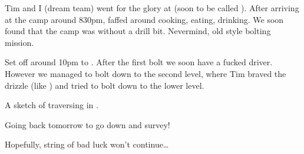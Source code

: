 Tim and I (dream team) went for the glory at  (soon to be
called ). After arriving at the camp around 830pm, faffed around cooking, eating, drinking. We soon found that the camp was without a drill bit. Nevermind, old style bolting mission.

Set off around 10pm to . After the first bolt we soon have a fucked driver. However we managed to bolt down to the second level, where Tim braved the drizzle (like ) and tried to bolt down to the lower level.


\begin{marginfigure}
\checkoddpage \ifoddpage \forcerectofloat \else \forceversofloat \fi
\centering
 \caption{A sketch of traversing in . }
 \label{bcrm traverse}
\end{marginfigure}


Going back tomorrow to go down and survey!

Hopefully, string of bad luck won't continue\ldots{}




